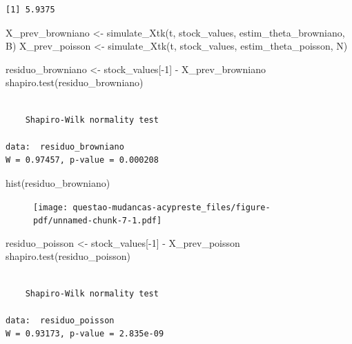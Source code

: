 \documentclass[
  letterpaper,
  DIV=11,
  numbers=noendperiod]{scrreprt}
\newenvironment{Shaded}{\begin{snugshade}}{\end{snugshade}}
\newcommand{\DecValTok}[1]{\textcolor[rgb]{0.68,0.00,0.00}{#1}}
\newcommand{\FunctionTok}[1]{\textcolor[rgb]{0.28,0.35,0.67}{#1}}
\newcommand{\NormalTok}[1]{\textcolor[rgb]{0.00,0.23,0.31}{#1}}
\newcommand{\OtherTok}[1]{\textcolor[rgb]{0.00,0.23,0.31}{#1}}
\newcommand{\SpecialCharTok}[1]{\textcolor[rgb]{0.37,0.37,0.37}{#1}}
\begin{document}
\begin{verbatim}
[1] 5.9375
\end{verbatim}

\begin{Shaded}
\begin{Highlighting}[]
\NormalTok{X\_prev\_browniano }\OtherTok{\textless{}{-}} \FunctionTok{simulate\_Xtk}\NormalTok{(t, stock\_values, estim\_theta\_browniano, B)}
\NormalTok{X\_prev\_poisson }\OtherTok{\textless{}{-}} \FunctionTok{simulate\_Xtk}\NormalTok{(t, stock\_values, estim\_theta\_poisson, N)}

\NormalTok{residuo\_browniano }\OtherTok{\textless{}{-}}\NormalTok{ stock\_values[}\SpecialCharTok{{-}}\DecValTok{1}\NormalTok{] }\SpecialCharTok{{-}}\NormalTok{ X\_prev\_browniano}
\FunctionTok{shapiro.test}\NormalTok{(residuo\_browniano)}
\end{Highlighting}
\end{Shaded}

\begin{verbatim}

    Shapiro-Wilk normality test

data:  residuo_browniano
W = 0.97457, p-value = 0.000208
\end{verbatim}

\begin{Shaded}
\begin{Highlighting}[]
\FunctionTok{hist}\NormalTok{(residuo\_browniano)}
\end{Highlighting}
\end{Shaded}

\begin{figure}[H]

{\centering \texttt{[image: questao-mudancas-acypreste\_files/figure-pdf/unnamed-chunk-7-1.pdf]}

}

\end{figure}

\begin{Shaded}
\begin{Highlighting}[]
\NormalTok{residuo\_poisson }\OtherTok{\textless{}{-}}\NormalTok{ stock\_values[}\SpecialCharTok{{-}}\DecValTok{1}\NormalTok{] }\SpecialCharTok{{-}}\NormalTok{ X\_prev\_poisson}
\FunctionTok{shapiro.test}\NormalTok{(residuo\_poisson)}
\end{Highlighting}
\end{Shaded}

\begin{verbatim}

    Shapiro-Wilk normality test

data:  residuo_poisson
W = 0.93173, p-value = 2.835e-09
\end{verbatim}
\end{document}
